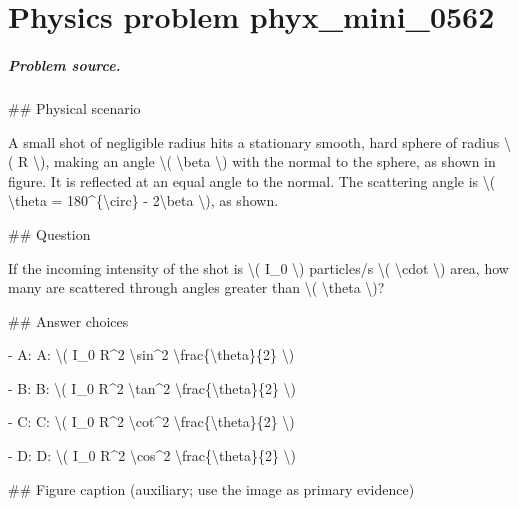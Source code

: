 
\chapter{Physics problem phyx\_mini\_0562}
\label{ch:PhyXMiniProblems_problem_phyx_mini_0562}

\paragraph{Problem source.}
\#\# Physical scenario

A small shot of negligible radius hits a stationary smooth, hard sphere of radius \textbackslash{}( R \textbackslash{}), making an angle \textbackslash{}( \textbackslash{}beta \textbackslash{}) with the normal to the sphere, as shown in figure. It is reflected at an equal angle to the normal. The scattering angle is \textbackslash{}( \textbackslash{}theta = 180\textasciicircum{}\{\textbackslash{}circ\} - 2\textbackslash{}beta \textbackslash{}), as shown.

\#\# Question

If the incoming intensity of the shot is \textbackslash{}( I\_0 \textbackslash{}) particles/s \textbackslash{}( \textbackslash{}cdot \textbackslash{}) area, how many are scattered through angles greater than \textbackslash{}( \textbackslash{}theta \textbackslash{})?

\#\# Answer choices

- A: A: \textbackslash{}( I\_0 R\textasciicircum{}2 \textbackslash{}sin\textasciicircum{}2 \textbackslash{}frac\{\textbackslash{}theta\}\{2\} \textbackslash{})

- B: B: \textbackslash{}( I\_0 R\textasciicircum{}2 \textbackslash{}tan\textasciicircum{}2 \textbackslash{}frac\{\textbackslash{}theta\}\{2\} \textbackslash{})

- C: C: \textbackslash{}( I\_0 R\textasciicircum{}2 \textbackslash{}cot\textasciicircum{}2 \textbackslash{}frac\{\textbackslash{}theta\}\{2\} \textbackslash{})

- D: D: \textbackslash{}( I\_0 R\textasciicircum{}2 \textbackslash{}cos\textasciicircum{}2 \textbackslash{}frac\{\textbackslash{}theta\}\{2\} \textbackslash{})

\#\# Figure caption (auxiliary; use the image as primary evidence)

